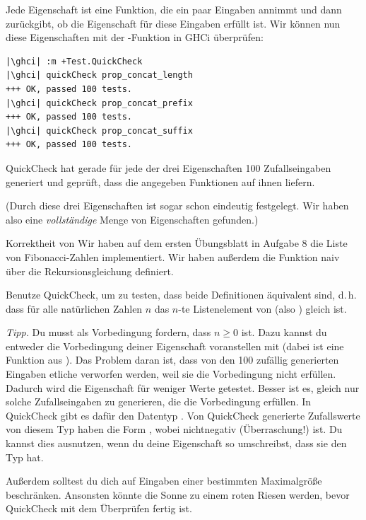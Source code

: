 \documentclass{uebblatt}
\newcommand{\refaufgabe}[1]{#1} %
\begin{document}
Jede Eigenschaft ist eine Funktion, die ein paar Eingaben annimmt und dann
zurückgibt, ob die Eigenschaft für diese Eingaben erfüllt ist. Wir können
nun diese Eigenschaften mit der -Funktion in GHCi
überprüfen:

\begin{verbatim}
|\ghci| :m +Test.QuickCheck
|\ghci| quickCheck prop_concat_length
+++ OK, passed 100 tests.
|\ghci| quickCheck prop_concat_prefix
+++ OK, passed 100 tests.
|\ghci| quickCheck prop_concat_suffix
+++ OK, passed 100 tests.
\end{verbatim}

QuickCheck hat gerade für jede der drei Eigenschaften 100 Zufallseingaben
generiert und geprüft, dass die angegeben Funktionen auf ihnen
 liefern.

(Durch diese drei Eigenschaften ist \haskellinline{(++)} sogar schon eindeutig
festgelegt. Wir haben also eine \emph{vollständige} Menge von Eigenschaften
gefunden.)

\begin{aufgabe}{Korrektheit von }
  Wir haben auf dem ersten Übungsblatt in Aufgabe \refaufgabe{8} die Liste
   von Fibonacci-Zahlen implementiert. Wir haben
  außerdem die Funktion  naiv über die
  Rekursionsgleichung  definiert.

  Benutze QuickCheck, um zu testen, dass beide Definitionen äquivalent sind,
  d.\,h. dass für alle natürlichen Zahlen $n$ das $n$-te Listenelement von
   (also ) gleich
   ist.
  
  \emph{Tipp.} Du musst als Vorbedingung fordern, dass $n \geq 0$ ist. Dazu
  kannst du entweder die Vorbedingung deiner Eigenschaft voranstellen mit
   (dabei ist \haskellinline{==>} eine Funktion
  aus ). Das Problem daran ist, dass von den 100
  zufällig generierten Eingaben etliche verworfen werden, weil sie die
  Vorbedingung nicht erfüllen. Dadurch wird die Eigenschaft für weniger Werte
  getestet. Besser ist es, gleich nur solche Zufallseingaben zu generieren, die
  die Vorbedingung erfüllen. In QuickCheck gibt es dafür den Datentyp
  . Von QuickCheck generierte Zufallswerte von
  diesem Typ haben die Form , wobei
   nichtnegativ (Überraschung!) ist. Du kannst dies
  ausnutzen, wenn du deine Eigenschaft so umschreibst, dass sie den Typ
   hat.
  
  Außerdem solltest du dich auf Eingaben einer bestimmten Maximalgröße
  beschränken. Ansonsten könnte die Sonne zu einem roten Riesen werden, bevor
  QuickCheck mit dem Überprüfen fertig ist.
\end{aufgabe}
\end{document}
